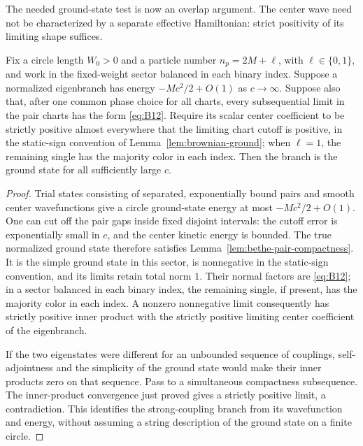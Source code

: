 The needed ground-state test is now an overlap argument.  The center
wave need not be characterized by a separate effective Hamiltonian:
strict positivity of its limiting shape suffices.

\begin{corollary}
\label{cor:bethe-ground-test}
Fix a circle length \(W_0>0\) and a particle number
\(n_p=2M+\ell\), with \(\ell\in\{0,1\}\), and work in the
fixed-weight sector balanced in each binary index.  Suppose a normalized eigenbranch
has energy \(-Mc^2/2+O(1)\) as \(c\to\infty\).  Suppose also that,
after one common phase choice for all charts, every subsequential limit
in the pair charts has the form \eqref{eq:B12}.  Require its scalar
center coefficient to be strictly positive almost everywhere that the
limiting chart cutoff is positive, in the static-sign convention of
Lemma~\ref{lem:brownian-ground}; when \(\ell=1\), the remaining single
has the majority color in each index.
Then the branch is the ground state for all sufficiently large \(c\).
\end{corollary}

\begin{proof}
Trial states consisting of separated, exponentially bound
pairs and smooth center wavefunctions give a circle ground-state
energy at most \(-Mc^2/2+O(1)\).  One can cut off the pair gaps
inside fixed disjoint intervals: the cutoff error is
exponentially small in \(c\), and the center kinetic energy is
bounded.  The true normalized ground state therefore satisfies
Lemma~\ref{lem:bethe-pair-compactness}.
It is the simple ground state in this sector, is nonnegative
in the static-sign convention, and its limits
retain total norm \(1\).  Their normal factors are
\eqref{eq:B12}; in a sector balanced in each binary index, the
remaining single, if present, has the majority color in each
index.  A nonzero nonnegative limit consequently has strictly positive
inner product with the strictly positive limiting center coefficient of
the eigenbranch.

If the two eigenstates were different for an unbounded sequence
of couplings, self-adjointness and the simplicity of the ground
state would make their inner products zero on that sequence.
Pass to a simultaneous compactness subsequence.  The inner-product
convergence just proved gives a strictly positive limit, a
contradiction.  This identifies the strong-coupling branch from
its wavefunction and energy, without assuming a string
description of the ground state on a finite circle.
\end{proof}
